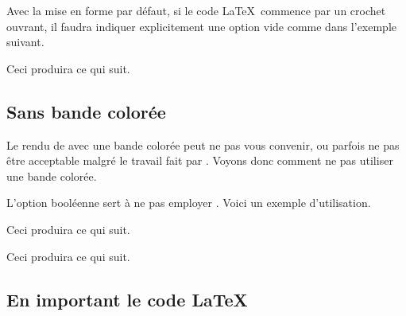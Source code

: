 

\begin{bdocwarn}
    Avec la mise en forme par défaut, si le code \LaTeX\ commence par un crochet ouvrant, il faudra indiquer explicitement une option vide comme dans l'exemple suivant.


    Ceci produira ce qui suit.

    \medskip

    
\end{bdocwarn}




\subsection{Sans bande colorée}

Le rendu de  avec une bande colorée peut ne pas vous convenir, ou parfois ne pas être acceptable malgré le travail fait par .
Voyons donc comment ne pas utiliser une bande colorée.

\begin{bdocexa}
    L'option booléenne  sert à ne pas employer .
    Voici un exemple d'utilisation.


    Ceci produira ce qui suit.

    \medskip

    
\end{bdocexa}




\begin{bdocexa}
    \leavevmode


    Ceci produira ce qui suit.

    \medskip

    
\end{bdocexa}




\subsection{En important le code \LaTeX}

